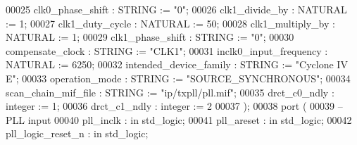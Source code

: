 \begin{DoxyCode}
00025       \textcolor{vhdlchar}{clk0_phase_shift}        \textcolor{vhdlchar}{:} \textcolor{comment}{STRING}    \textcolor{vhdlchar}{:=} \textcolor{vhdllogic}{"0"};
00026       \textcolor{vhdlchar}{clk1_divide_by}          \textcolor{vhdlchar}{:} \textcolor{comment}{NATURAL}   \textcolor{vhdlchar}{:=} \textcolor{vhdllogic}{}\textcolor{vhdllogic}{1};
00027       \textcolor{vhdlchar}{clk1_duty_cycle}         \textcolor{vhdlchar}{:} \textcolor{comment}{NATURAL}   \textcolor{vhdlchar}{:=} \textcolor{vhdllogic}{}\textcolor{vhdllogic}{50};
00028       \textcolor{vhdlchar}{clk1_multiply_by}        \textcolor{vhdlchar}{:} \textcolor{comment}{NATURAL}   \textcolor{vhdlchar}{:=} \textcolor{vhdllogic}{}\textcolor{vhdllogic}{1};
00029       \textcolor{vhdlchar}{clk1_phase_shift}        \textcolor{vhdlchar}{:} \textcolor{comment}{STRING}    \textcolor{vhdlchar}{:=} \textcolor{vhdllogic}{"0"};
00030       \textcolor{vhdlchar}{compensate_clock}        \textcolor{vhdlchar}{:} \textcolor{comment}{STRING}    \textcolor{vhdlchar}{:=} \textcolor{keyword}{"CLK1"};
00031       \textcolor{vhdlchar}{inclk0_input_frequency}  \textcolor{vhdlchar}{:} \textcolor{comment}{NATURAL}   \textcolor{vhdlchar}{:=} \textcolor{vhdllogic}{}\textcolor{vhdllogic}{6250};
00032       \textcolor{vhdlchar}{intended_device_family}  \textcolor{vhdlchar}{:} \textcolor{comment}{STRING}    \textcolor{vhdlchar}{:=} \textcolor{keyword}{"Cyclone IV E"};
00033       \textcolor{vhdlchar}{operation_mode}          \textcolor{vhdlchar}{:} \textcolor{comment}{STRING}    \textcolor{vhdlchar}{:=} \textcolor{keyword}{"SOURCE\_SYNCHRONOUS"};
00034       \textcolor{vhdlchar}{scan_chain_mif_file}     \textcolor{vhdlchar}{:} \textcolor{comment}{STRING}    \textcolor{vhdlchar}{:=} \textcolor{keyword}{"ip/txpll/pll.mif"};
00035       \textcolor{vhdlchar}{drct_c0_ndly}            \textcolor{vhdlchar}{:} \textcolor{comment}{integer}   \textcolor{vhdlchar}{:=} \textcolor{vhdllogic}{}\textcolor{vhdllogic}{1};
00036       \textcolor{vhdlchar}{drct_c1_ndly}            \textcolor{vhdlchar}{:} \textcolor{comment}{integer}   \textcolor{vhdlchar}{:=} \textcolor{vhdllogic}{}\textcolor{vhdllogic}{2}
00037    \textcolor{vhdlchar}{)};
00038    \textcolor{keywordflow}{port} \textcolor{vhdlchar}{(}
00039 \textcolor{keyword}{   --PLL input }
00040    \textcolor{vhdlchar}{pll_inclk}         \textcolor{vhdlchar}{:} \textcolor{keywordflow}{in} \textcolor{comment}{std\_logic};
00041    \textcolor{vhdlchar}{pll_areset}        \textcolor{vhdlchar}{:} \textcolor{keywordflow}{in} \textcolor{comment}{std\_logic};
00042    \textcolor{vhdlchar}{pll_logic_reset_n} \textcolor{vhdlchar}{:} \textcolor{keywordflow}{in} \textcolor{comment}{std\_logic};

\end{DoxyCode}
